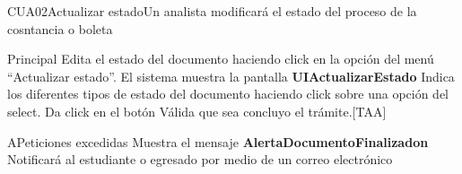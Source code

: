 \begin{UseCase}{CUA02}{Actualizar estado}{Un analista modificará el estado del proceso de la cosntancia o boleta}
{\begin{itemize}
		\end{itemize}
  }
\end{UseCase}

\begin{UCtrayectoria}{Principal}
  \UCpaso[\UCactor] Edita el estado del documento  haciendo click en la opción del menú ``Actualizar estado”.
  \UCpaso El sistema muestra la pantalla  {\bf UIActualizarEstado}
  \UCpaso[\UCactor] Indica los diferentes  tipos de estado del documento haciendo click sobre una opción del select.
  \UCpaso[\UCactor] Da click en el botón 
  \UCpaso  Válida que sea concluyo el trámite.[TAA] 
\end{UCtrayectoria}

\begin{UCtrayectoriaA}{A}{Peticiones excedidas} 
\UCpaso Muestra el mensaje {\bf AlertaDocumentoFinalizadon}
  \UCpaso Notificará al estudiante o egresado por medio de un correo electrónico  	
\end{UCtrayectoriaA}
